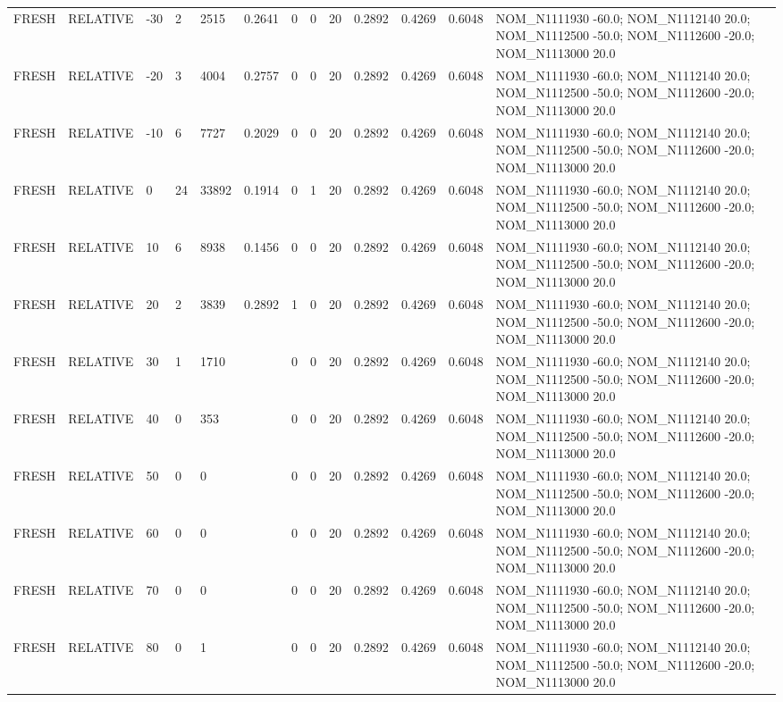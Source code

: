 \begin{table}[ht]
\begin{tabular}{lllllllllllll}
FRESH & RELATIVE & -30 & 2 & 2515 & 0.2641 & 0 & 0 & 20 & 0.2892 & 0.4269 & 0.6048 & NOM\_N1111930 -60.0; NOM\_N1112140 20.0; NOM\_N1112500 -50.0; NOM\_N1112600 -20.0; NOM\_N1113000 20.0 \\
FRESH & RELATIVE & -20 & 3 & 4004 & 0.2757 & 0 & 0 & 20 & 0.2892 & 0.4269 & 0.6048 & NOM\_N1111930 -60.0; NOM\_N1112140 20.0; NOM\_N1112500 -50.0; NOM\_N1112600 -20.0; NOM\_N1113000 20.0 \\
FRESH & RELATIVE & -10 & 6 & 7727 & 0.2029 & 0 & 0 & 20 & 0.2892 & 0.4269 & 0.6048 & NOM\_N1111930 -60.0; NOM\_N1112140 20.0; NOM\_N1112500 -50.0; NOM\_N1112600 -20.0; NOM\_N1113000 20.0 \\
FRESH & RELATIVE & 0 & 24 & 33892 & 0.1914 & 0 & 1 & 20 & 0.2892 & 0.4269 & 0.6048 & NOM\_N1111930 -60.0; NOM\_N1112140 20.0; NOM\_N1112500 -50.0; NOM\_N1112600 -20.0; NOM\_N1113000 20.0 \\
FRESH & RELATIVE & 10 & 6 & 8938 & 0.1456 & 0 & 0 & 20 & 0.2892 & 0.4269 & 0.6048 & NOM\_N1111930 -60.0; NOM\_N1112140 20.0; NOM\_N1112500 -50.0; NOM\_N1112600 -20.0; NOM\_N1113000 20.0 \\
FRESH & RELATIVE & 20 & 2 & 3839 & 0.2892 & 1 & 0 & 20 & 0.2892 & 0.4269 & 0.6048 & NOM\_N1111930 -60.0; NOM\_N1112140 20.0; NOM\_N1112500 -50.0; NOM\_N1112600 -20.0; NOM\_N1113000 20.0 \\
FRESH & RELATIVE & 30 & 1 & 1710 &  & 0 & 0 & 20 & 0.2892 & 0.4269 & 0.6048 & NOM\_N1111930 -60.0; NOM\_N1112140 20.0; NOM\_N1112500 -50.0; NOM\_N1112600 -20.0; NOM\_N1113000 20.0 \\
FRESH & RELATIVE & 40 & 0 & 353 &  & 0 & 0 & 20 & 0.2892 & 0.4269 & 0.6048 & NOM\_N1111930 -60.0; NOM\_N1112140 20.0; NOM\_N1112500 -50.0; NOM\_N1112600 -20.0; NOM\_N1113000 20.0 \\
FRESH & RELATIVE & 50 & 0 & 0 &  & 0 & 0 & 20 & 0.2892 & 0.4269 & 0.6048 & NOM\_N1111930 -60.0; NOM\_N1112140 20.0; NOM\_N1112500 -50.0; NOM\_N1112600 -20.0; NOM\_N1113000 20.0 \\
FRESH & RELATIVE & 60 & 0 & 0 &  & 0 & 0 & 20 & 0.2892 & 0.4269 & 0.6048 & NOM\_N1111930 -60.0; NOM\_N1112140 20.0; NOM\_N1112500 -50.0; NOM\_N1112600 -20.0; NOM\_N1113000 20.0 \\
FRESH & RELATIVE & 70 & 0 & 0 &  & 0 & 0 & 20 & 0.2892 & 0.4269 & 0.6048 & NOM\_N1111930 -60.0; NOM\_N1112140 20.0; NOM\_N1112500 -50.0; NOM\_N1112600 -20.0; NOM\_N1113000 20.0 \\
FRESH & RELATIVE & 80 & 0 & 1 &  & 0 & 0 & 20 & 0.2892 & 0.4269 & 0.6048 & NOM\_N1111930 -60.0; NOM\_N1112140 20.0; NOM\_N1112500 -50.0; NOM\_N1112600 -20.0; NOM\_N1113000 20.0 \\
\bottomrule
\end{tabular}
\end{table}
